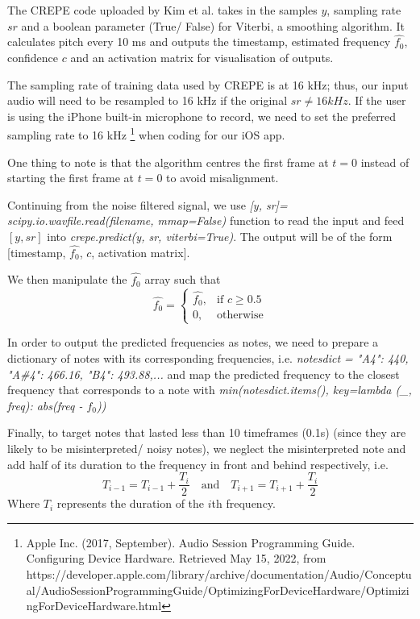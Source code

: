 The CREPE code uploaded by Kim et al. takes in the samples $y$, sampling rate $sr$ and a boolean parameter (True/ False) for Viterbi, a smoothing algorithm. 
It calculates pitch every 10 ms and outputs the timestamp, estimated frequency $\hat{f_0}$, confidence $c$ and an activation matrix for visualisation of outputs. 

The sampling rate of training data used by CREPE is at 16 kHz; thus, our input audio will need to be resampled to 16 kHz if the original $sr \neq 16 kHz$. If the user is using the iPhone 
built-in microphone to record, we need to set the preferred sampling rate to 16 kHz \footnote{Apple Inc. (2017, September). Audio Session Programming Guide. Configuring Device Hardware. Retrieved May 15, 2022, from https://developer.apple.com/library/archive/documentation/Audio/Conceptual/AudioSessionProgrammingGuide/OptimizingForDeviceHardware/OptimizingForDeviceHardware.html }
when coding for our iOS app.

One thing to note is that the algorithm centres the first frame at $t=0$ instead of starting the first frame at $t=0$ to avoid misalignment.

Continuing from the noise filtered signal, we use \emph{[y, sr]= scipy.io.wavfile.read(filename, mmap=False)} function to read the input and feed $[y, sr]$ 
into \emph{crepe.predict(y, sr, viterbi=True)}.
The output will be of the form [timestamp, $\hat{f_0}$, $c$, activation matrix].

We then manipulate the $\hat{f_0}$ array such that
\begin{equation}
    \hat{f_0}= 
\begin{cases}
    \hat{f_0},      & \text{if } c\geq 0.5\\
    0,              & \text{otherwise}
\end{cases}
\label{creperesult}
\end{equation}

In order to output the predicted frequencies as notes, we need to prepare a dictionary of notes with its corresponding frequencies, i.e. 
\emph{notesdict = {"A4": 440, "A\#4": 466.16, "B4": 493.88,...}}
and map the predicted frequency to the closest frequency that corresponds to a note with \emph{min(notesdict.items(), key=lambda (\_, freq): abs(freq - $f_0$))}
 
Finally, to target notes that lasted less than 10 timeframes (0.1s) (since they are likely to be misinterpreted/ noisy notes),
we neglect the misinterpreted note and add half of its duration to the frequency in front and behind respectively, i.e.
\begin{equation}
    T_{i-1} = T_{i-1} + \frac{T_i}{2}
        \quad \mathrm{and} \quad
    T_{i+1} = T_{i+1} + \frac{T_i}{2}
\end{equation}
Where $T_i$ represents the duration of the $i$th frequency.

